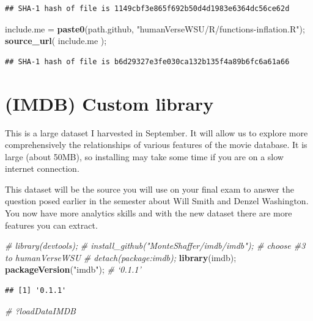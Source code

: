 \documentclass[]{article}
\newenvironment{Shaded}{\begin{snugshade}}{\end{snugshade}}
\newcommand{\CommentTok}[1]{\textcolor[rgb]{0.56,0.35,0.01}{\textit{#1}}}
\newcommand{\KeywordTok}[1]{\textcolor[rgb]{0.13,0.29,0.53}{\textbf{#1}}}
\newcommand{\NormalTok}[1]{#1}
\newcommand{\StringTok}[1]{\textcolor[rgb]{0.31,0.60,0.02}{#1}}
\begin{document}
\begin{verbatim}
## SHA-1 hash of file is 1149cbf3e865f692b50d4d1983e6364dc56ce62d
\end{verbatim}

\begin{Shaded}
\begin{Highlighting}[]
\NormalTok{include.me =}\StringTok{ }\KeywordTok{paste0}\NormalTok{(path.github, }\StringTok{"humanVerseWSU/R/functions{-}inflation.R"}\NormalTok{);}
\KeywordTok{source\_url}\NormalTok{( include.me );}
\end{Highlighting}
\end{Shaded}

\begin{verbatim}
## SHA-1 hash of file is b6d29327e3fe030ca132b135f4a89b6fc6a61a66
\end{verbatim}

\hypertarget{imdb-custom-library}{%
\section{(IMDB) Custom library}\label{imdb-custom-library}}

This is a large dataset I harvested in September. It will allow us to
explore more comprehensively the relationships of various features of
the movie database. It is large (about 50MB), so installing may take
some time if you are on a slow internet connection.

This dataset will be the source you will use on your final exam to
answer the question posed earlier in the semester about Will Smith and
Denzel Washington. You now have more analytics skills and with the new
dataset there are more features you can extract.

\begin{Shaded}
\begin{Highlighting}[]
\CommentTok{\# library(devtools);}
\CommentTok{\# install\_github("MonteShaffer/imdb/imdb"); \# choose \#3 to humanVerseWSU}
\CommentTok{\# detach(package:imdb);}
\KeywordTok{library}\NormalTok{(imdb);}
\KeywordTok{packageVersion}\NormalTok{(}\StringTok{"imdb"}\NormalTok{);  }\CommentTok{\# ‘0.1.1’}
\end{Highlighting}
\end{Shaded}

\begin{verbatim}
## [1] '0.1.1'
\end{verbatim}

\begin{Shaded}
\begin{Highlighting}[]
\CommentTok{\# ?loadDataIMDB}
\end{Highlighting}
\end{Shaded}
\end{document}
